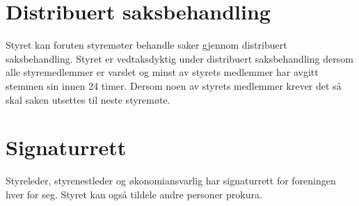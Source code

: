 \section{Distribuert saksbehandling}
Styret kan foruten styremøter behandle saker gjennom distribuert saksbehandling. Styret er vedtaksdyktig under distribuert saksbehandling dersom alle styremedlemmer er varslet og minst  av styrets medlemmer har avgitt stemmen sin innen 24 timer. Dersom noen av styrets medlemmer krever det så skal saken utsettes til neste styremøte.

\section{Signaturrett}
Styreleder, styrenestleder og økonomiansvarlig har signaturrett for foreningen hver for seg. Styret kan også tildele andre personer prokura.
